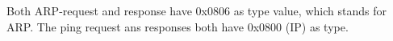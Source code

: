 Both ARP-request and response have 0x0806 as type value, which stands for ARP.
The ping request ans responses both have 0x0800 (IP) as type.
